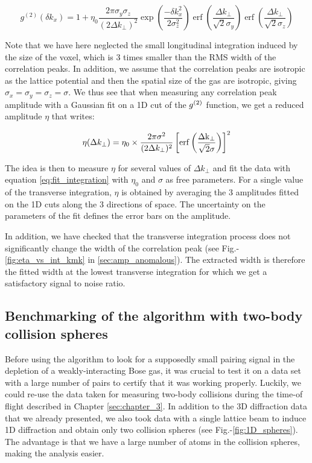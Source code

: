 \begin{equation}
    g^{(2)} \left(\delta k_{x}\right)=1+\eta_0 \frac{2 \pi \sigma_y \sigma_z}{\left(2 \Delta k_{\perp}\right)^{2}} \exp \left(\frac{-\delta k_{x}^{2}}{2 \sigma_{z}^{2}}\right) \operatorname{erf}\left(\frac{\Delta k_{\perp}}{\sqrt{2} \sigma_{y}}\right) \operatorname{erf}\left(\frac{\Delta k_{\perp}}{\sqrt{2} \sigma_{z}}\right)
\end{equation}

Note that we have here neglected the small longitudinal integration induced by the size of the voxel, which is 3 times smaller than the RMS width of the correlation peaks. In addition, we assume that the correlation peaks are isotropic as the lattice potential and then the spatial size of the gas are isotropic, giving $\sigma_x=\sigma_y=\sigma_z=\sigma$. We thus see that when measuring any correlation peak amplitude with a Gaussian fit on a 1D cut of the $g^{(2)}$ function, we get a reduced amplitude $\eta$ that writes:

\begin{equation}
    \eta (\Delta k_{\perp})= \eta_{0} \times \frac{2 \pi \sigma^2}{(2\Delta k_{\perp})^2}\left[\rm{erf} \left(\frac{\Delta k_{\perp}}{\sqrt{2}\sigma} \right)\right]^2
    \label{eq:fit_integration}
\end{equation}

The idea is then to measure $\eta$ for several values of $\Delta k_{\perp}$ and fit the data with equation \ref{eq:fit_integration} with $\eta_0$ and $\sigma$ as free parameters. For a single value of the transverse integration, $\eta$ is obtained by averaging the 3 amplitudes fitted on the 1D cuts along the 3 directions of space. The uncertainty on the parameters of the fit defines the error bars on the amplitude.

In addition, we have checked that the transverse integration process does not significantly change the width of the correlation peak (see Fig.-\ref{fig:eta_vs_int_kmk} in \ref{sec:amp_anomalous}). The extracted width is therefore the fitted width at the lowest transverse integration for which we get a satisfactory signal to noise ratio.


\subsection{Benchmarking of the algorithm with two-body collision spheres}

\label{sec:benchmark_algo}

Before using the algorithm to look for a supposedly small \kmk pairing signal in the depletion of a weakly-interacting Bose gas, it was crucial to test it on a data set with a large number of \kmk pairs to certify that it was working properly. Luckily, we could re-use the data taken for measuring two-body collisions during the time-of flight described in Chapter \ref{sec:chapter_3}. In addition to the 3D diffraction data that we already presented, we also took data with a single lattice beam to induce 1D diffraction and obtain only two collision spheres (see Fig.-\ref{fig:1D_spheres}). The advantage is that we have a large number of atoms in the collision spheres, making the analysis easier. 

